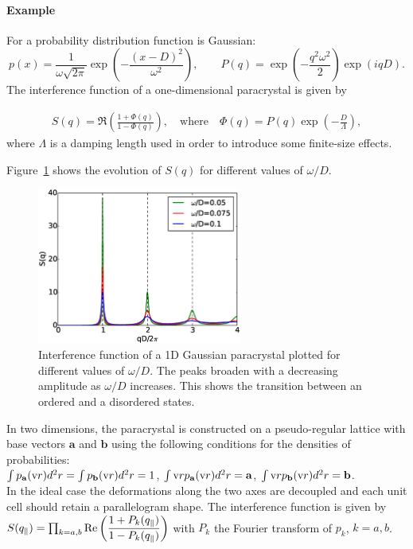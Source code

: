 \paragraph{Example} For a probability distribution function is Gaussian:
\begin{equation*}
p(x)=\frac{1}{\omega \sqrt{2\pi}} \exp\left(-\dfrac{(x-D)^2}{\omega^2}\right),\qquad P(q)=\exp\left(-\frac{q^2 \omega^2}{2}\right)\exp(iqD).
\end{equation*}
 The interference function of a one-dimensional paracrystal is given by

\begin{align*}
S(q) =\Re \left(\frac{1+\Phi(q) }{1 - \Phi(q)} \right), \quad \mathrm{where}\quad \Phi(q) = P(q)\exp\left(-\frac{D}{\Lambda}\right),
\end{align*}
where $\Lambda$ is a damping length used in order to introduce some finite-size effects.

Figure~\ref{fig:1dparas_q} shows the evolution of $S(q)$ for different values of $\omega /D$.

\begin{figure}[tb]
\begin{center}
\includegraphics[width=0.6\textwidth]{fig/funcplot/S_q_1Dparacrystal.eps}
\end{center}
\caption{Interference function of a 1D Gaussian paracrystal plotted for different values of $\omega /D$. The peaks broaden with a decreasing amplitude as $\omega/D$ increases. This shows the transition between an ordered and a disordered states. }
\label{fig:1dparas_q}
\end{figure}

In two dimensions, the paracrystal is constructed on a pseudo-regular lattice with base vectors $\mathbf{a}$ and $\mathbf{b}$ using the following conditions for the densities of probabilities:\\ $\int p_{\mathbf{a}}(\text{v}{r})d^2r=\int p_{\mathbf{b}}(\text{v}{r})d^2r=1$, $\int \text{v}{r} p_{\mathbf{a}}(\text{v}{r})d^2r=\mathbf{a}$, $\int \text{v}{r} p_{\mathbf{b}}(\text{v}{r})d^2r=\mathbf{b}$.\\
In the ideal case the deformations along the two axes are decoupled and each unit cell should retain a parallelogram shape. The interference function is given by\\ $S(q_{\parallel})=\prod_{k=a,b}\operatorname{Re}\left(\dfrac{1+P_k(q_{\parallel})}{1-P_k(q_{\parallel})} \right)$ with $P_k$ the Fourier transform of $p_k$, $k=a, b$.

